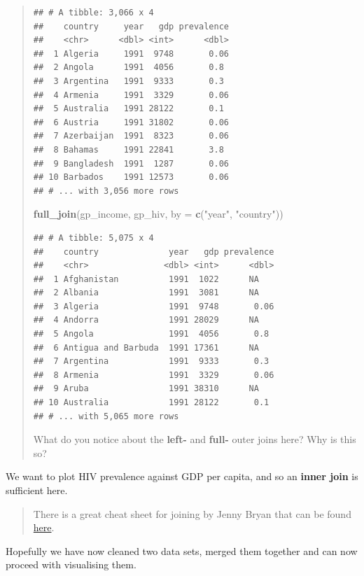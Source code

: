 \documentclass[]{book}
\newenvironment{Shaded}{\begin{snugshade}}{\end{snugshade}}
\newcommand{\KeywordTok}[1]{\textcolor[rgb]{0.13,0.29,0.53}{\textbf{{#1}}}}
\newcommand{\DataTypeTok}[1]{\textcolor[rgb]{0.13,0.29,0.53}{{#1}}}
\newcommand{\StringTok}[1]{\textcolor[rgb]{0.31,0.60,0.02}{{#1}}}
\newcommand{\NormalTok}[1]{{#1}}
\theoremstyle{definition}
\theoremstyle{definition}
\theoremstyle{definition}
\theoremstyle{remark}
\begin{document}
\begin{quote}
\begin{verbatim}
## # A tibble: 3,066 x 4
##    country     year   gdp prevalence
##    <chr>      <dbl> <int>      <dbl>
##  1 Algeria     1991  9748       0.06
##  2 Angola      1991  4056       0.8 
##  3 Argentina   1991  9333       0.3 
##  4 Armenia     1991  3329       0.06
##  5 Australia   1991 28122       0.1 
##  6 Austria     1991 31802       0.06
##  7 Azerbaijan  1991  8323       0.06
##  8 Bahamas     1991 22841       3.8 
##  9 Bangladesh  1991  1287       0.06
## 10 Barbados    1991 12573       0.06
## # ... with 3,056 more rows
\end{verbatim}

\begin{Shaded}
\begin{Highlighting}[]
\KeywordTok{full_join}\NormalTok{(gp_income, gp_hiv, }\DataTypeTok{by =} \KeywordTok{c}\NormalTok{(}\StringTok{"year"}\NormalTok{, }\StringTok{"country"}\NormalTok{))}
\end{Highlighting}
\end{Shaded}

\begin{verbatim}
## # A tibble: 5,075 x 4
##    country              year   gdp prevalence
##    <chr>               <dbl> <int>      <dbl>
##  1 Afghanistan          1991  1022      NA   
##  2 Albania              1991  3081      NA   
##  3 Algeria              1991  9748       0.06
##  4 Andorra              1991 28029      NA   
##  5 Angola               1991  4056       0.8 
##  6 Antigua and Barbuda  1991 17361      NA   
##  7 Argentina            1991  9333       0.3 
##  8 Armenia              1991  3329       0.06
##  9 Aruba                1991 38310      NA   
## 10 Australia            1991 28122       0.1 
## # ... with 5,065 more rows
\end{verbatim}

What do you notice about the \textbf{left-} and \textbf{full-} outer
joins here? Why is this so?
\end{quote}

We want to plot HIV prevalence against GDP per capita, and so an
\textbf{inner join} is sufficient here.

\begin{quote}
There is a great cheat sheet for joining by Jenny Bryan that can be
found \href{http://stat545.com/bit001_dplyr-cheatsheet.html}{here}.
\end{quote}

Hopefully we have now cleaned two data sets, merged them together and
can now proceed with visualising them.
\end{document}
